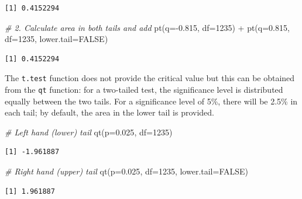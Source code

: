 \documentclass[
  oneside]{krantz}
\newenvironment{Shaded}{\begin{snugshade}}{\end{snugshade}}
\newcommand{\AttributeTok}[1]{\textcolor[rgb]{0.77,0.63,0.00}{#1}}
\newcommand{\CommentTok}[1]{\textcolor[rgb]{0.56,0.35,0.01}{\textit{#1}}}
\newcommand{\ConstantTok}[1]{\textcolor[rgb]{0.00,0.00,0.00}{#1}}
\newcommand{\DecValTok}[1]{\textcolor[rgb]{0.00,0.00,0.81}{#1}}
\newcommand{\FloatTok}[1]{\textcolor[rgb]{0.00,0.00,0.81}{#1}}
\newcommand{\FunctionTok}[1]{\textcolor[rgb]{0.00,0.00,0.00}{#1}}
\newcommand{\NormalTok}[1]{#1}
\newcommand{\SpecialCharTok}[1]{\textcolor[rgb]{0.00,0.00,0.00}{#1}}
\begin{document}
\begin{verbatim}
[1] 0.4152294
\end{verbatim}

\begin{Shaded}
\begin{Highlighting}[]
\CommentTok{\# 2. Calculate area in both tails and add}
\FunctionTok{pt}\NormalTok{(}\AttributeTok{q=}\SpecialCharTok{{-}}\FloatTok{0.815}\NormalTok{, }\AttributeTok{df=}\DecValTok{1235}\NormalTok{) }\SpecialCharTok{+} \FunctionTok{pt}\NormalTok{(}\AttributeTok{q=}\FloatTok{0.815}\NormalTok{, }\AttributeTok{df=}\DecValTok{1235}\NormalTok{, }\AttributeTok{lower.tail=}\ConstantTok{FALSE}\NormalTok{)}
\end{Highlighting}
\end{Shaded}

\begin{verbatim}
[1] 0.4152294
\end{verbatim}

The \texttt{t.test} function does not provide the critical value but this can be obtained from the \texttt{qt} function: for a two-tailed test, the significance level is distributed equally between the two tails. For a significance level of 5\%, there will be 2.5\% in each tail; by default, the area in the lower tail is provided.

\begin{Shaded}
\begin{Highlighting}[]
\CommentTok{\# Left hand (lower) tail}
\FunctionTok{qt}\NormalTok{(}\AttributeTok{p=}\FloatTok{0.025}\NormalTok{, }\AttributeTok{df=}\DecValTok{1235}\NormalTok{)}
\end{Highlighting}
\end{Shaded}

\begin{verbatim}
[1] -1.961887
\end{verbatim}

\begin{Shaded}
\begin{Highlighting}[]
\CommentTok{\# Right hand (upper) tail}
\FunctionTok{qt}\NormalTok{(}\AttributeTok{p=}\FloatTok{0.025}\NormalTok{, }\AttributeTok{df=}\DecValTok{1235}\NormalTok{, }\AttributeTok{lower.tail=}\ConstantTok{FALSE}\NormalTok{)}
\end{Highlighting}
\end{Shaded}

\begin{verbatim}
[1] 1.961887
\end{verbatim}
\end{document}
